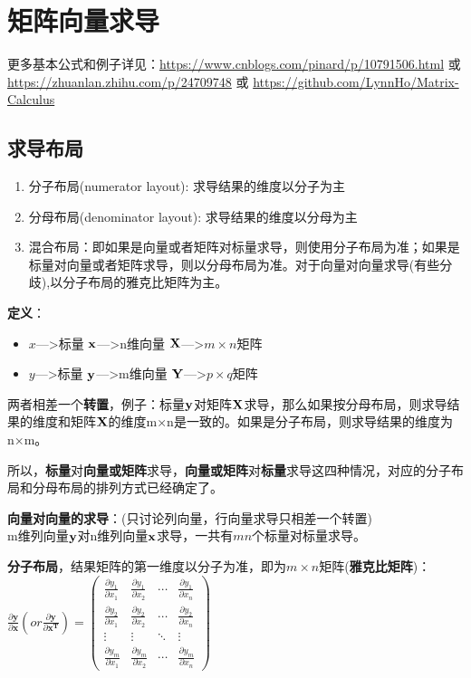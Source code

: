     \section{矩阵向量求导}
    更多基本公式和例子详见：\url{https://www.cnblogs.com/pinard/p/10791506.html} 或 \url{https://zhuanlan.zhihu.com/p/24709748} 或 \url{https://github.com/LynnHo/Matrix-Calculus}
    \subsection{求导布局}
    \begin{enumerate}
        \item 分子布局(numerator layout): 求导结果的维度以分子为主
        \item 分母布局(denominator layout): 求导结果的维度以分母为主
        \item 混合布局：即如果是向量或者矩阵对标量求导，则使用分子布局为准；如果是标量对向量或者矩阵求导，则以分母布局为准。对于向量对向量求导(有些分歧),以分子布局的雅克比矩阵为主。
    \end{enumerate}
    \textbf{定义}：
    \begin{itemize}
        \item $x$--->标量 \quad $\bf{x}$--->n维向量 \quad $\bf{X}$--->$m \times n$矩阵
        \item $y$--->标量 \quad $\bf{y}$--->m维向量 \quad $\bf{Y}$--->$p \times q$矩阵
    \end{itemize}
    两者相差一个\textbf{转置}，例子：标量$\bf{y}$对矩阵$\bf{X}$求导，那么如果按分母布局，则求导结果的维度和矩阵$\bf{X}$的维度m×n是一致的。如果是分子布局，则求导结果的维度为n×m。


    所以，\textbf{标量}对\textbf{向量或矩阵}求导，\textbf{向量或矩阵}对\textbf{标量}求导这四种情况，对应的分子布局和分母布局的排列方式已经确定了。


    \textbf{向量对向量的求导}：(只讨论列向量，行向量求导只相差一个转置) \\
    m维列向量$\bf{y}$对n维列向量$\bf{x}$求导，一共有$mn$个标量对标量求导。


    \textbf{分子布局}，结果矩阵的第一维度以分子为准，即为$m\times n$矩阵(\textbf{雅克比矩阵})：\\
    $\frac{\partial \mathbf{y}}{\partial \mathbf{x}}(or \frac{\partial \mathbf{y}}{\partial \mathbf{x}^{\mathbf{T}}})=\left(\begin{array}{cccc}{\frac{\partial y_{1}}{\partial x_{1}}} & {\frac{\partial y_{1}}{\partial x_{2}}} & {\cdots} & {\frac{\partial y_{1}}{\partial x_{n}}} \\ {\frac{\partial y_{2}}{\partial x_{1}}} & {\frac{\partial y_{2}}{\partial x_{2}}} & {\cdots} & {\frac{\partial y_{2}}{\partial x_{n}}} \\ {\vdots} & {\vdots} & {\ddots} & {\vdots} \\ {\frac{\partial y_{m}}{\partial x_{1}}} & {\frac{\partial y_{m}}{\partial x_{2}}} & {\cdots} & {\frac{\partial y_{m}}{\partial x_{n}}}\end{array}\right)$


